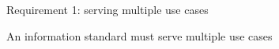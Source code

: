 \begin{frame}
  \epigraph{\huge Requirement 1: serving multiple use cases}{An information standard must serve multiple use cases}
\end{frame}
